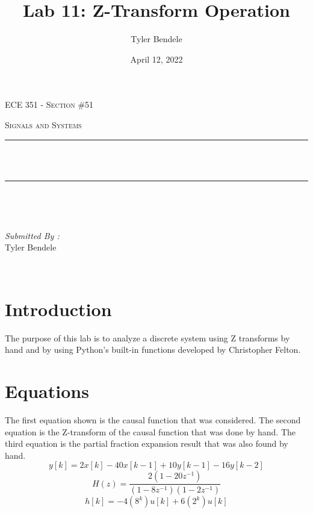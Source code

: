 \documentclass[12pt]{report}
\title{Lab 11: Z-Transform Operation}
\author{Tyler Bendele}
\date{April 12, 2022}
\makeatletter
\let\thetitle\@title
\makeatother
\begin{document}
\begin{titlepage}
\centering
\vspace*{0.5 cm}

\begin{center}    \textsc{\Large   ECE 351 - Section \#51 }\\[2.0 cm]
\end{center}%
\textsc{\Large Signals and Systems  }\\[0.5 cm] %

\rule{\linewidth}{0.2 mm} \\[0.4 cm]
{ \huge \bfseries \thetitle}\\
\rule{\linewidth}{0.2 mm} \\[1.5 cm]
\begin{minipage}{0.4\textwidth}
\begin{flushleft} \large
\end{flushleft}
\end{minipage}~
\begin{minipage}{0.4\textwidth}
\begin{flushright} \large
\emph{Submitted By :} \\
Tyler Bendele
\end{flushright}
\end{minipage}\\[2 cm]
\end{titlepage}
\tableofcontents
\pagebreak
\renewcommand{\thesection}{\arabic{section}}
\section{Introduction}
The purpose of this lab is to analyze a discrete system using Z transforms
by hand and by using Python's built-in functions developed by Christopher 
Felton.
\section{Equations}
The first equation shown is the causal function that was considered.
The second equation is the Z-transform of the causal function that was
done by hand. The third equation is the partial fraction expansion result
that was also found by hand.
\begin{equation}
    y[k] = 2x[k] - 40x[k-1] + 10y[k-1] - 16y[k-2]
\end{equation}
\begin{equation}
    H(z) = \frac{2 (1 - 20z^{-1})}{(1 - 8z^{-1})(1 - 2z^{-1})}
\end{equation}
\begin{equation}
    h[k] = -4(8^{k})u[k] + 6(2^{k})u[k]
\end{equation}
\end{document}
